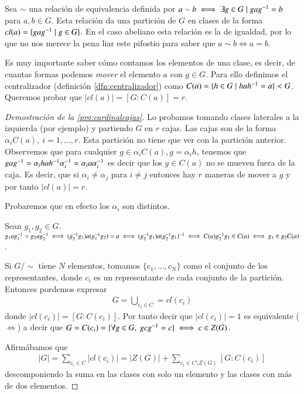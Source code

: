 Sea $\sim$ una relación de equivalencia definida por $a\sim b \iff \exists g \in G \mid gag^{-1} = b$ para $a,b \in G$. Esta relación da una partición de $G$ en clases de la forma $cl(a) = \{gag^{-1} \mid g \in G\}$. En el caso abeliano esta relación es la de igualdad, por lo que no nos merece la pena liar este pifostio para saber que $a\sim b \iff a = b$. 

Es muy importante saber cómo contamos los elementos de una clase, es decir, de cuantas formas podemos \textit{mover} el elemento $a$ con $g \in G$. Para ello definimos el centralizador (definición \ref{dfn:centralizador}) como $C(a) = \{h \in G \mid hah^{-1} = a\} < G$. Queremos probar que $|cl(a)| = [G:C(a)] = r$.

\begin{proof}[Demostración de la \autoref{pro:cardinalcajas}]
	
	Lo probamos tomando clases laterales a la izquierda (por ejemplo) y partiendo $G$ en $r$ cajas. Las cajas son de la forma $\alpha_iC(a),\ i = 1, \dots, r$. Esta partición no tiene que ver con la partición anterior. Observemos que para cualquier $g \in \alpha_i C(a), g = \alpha_i h$, tenemos que $g a g^{-1} = \alpha_i h a h^{-1} \alpha_i^{-1} = \alpha_i a \alpha_i^{-1}$ es decir que los $g \in C(a)$ no se mueven fuera de la caja. Es decir, que si $\alpha_i \neq \alpha_j$ para $i\neq j$ entonces hay $r$ maneras de mover a $g$ y por tanto $|cl(a)| = r$.
	
	Probaremos que en efecto los $\alpha_i$ son distintos.
	
	Sean $g_1, g_2 \in G$. $g_1ag_1^{-1} = g_2ag_2^{-1} \iff (g_2^{-1}g_1)a(g_1^{-1}g_2) = a \iff (g_2^{-1}g_1)a(g_2^{-1}g_1)^{-1} \iff C(a) g_2^{-1}g_1 \in C(a) \iff g_1 \in g_2C(a)$.
	
	Si $G/\sim$ tiene $N$ elementos, tomamos $\{c_1, \dots, c_N\}$ como el conjunto de los representantes, donde $c_i$ es un representante de cada conjunto de la partición. Entonces pordemos expresar
	\begin{align*}
	G = \bigcup_{c_i \in C} = cl(c_i)
	\end{align*}
	donde $|cl(c_i)| = [G:C(c_i)]$. Por tanto decir que $|cl(c_i)| = 1$ es equivalente ($\iff$) a decir que $G = C(c_i) = \{\forall g \in G,\ gc\inv{g} = c\} \iff c \in Z(G)$.
	
	Afirmábamos que
	\begin{align*}
	|G| = \sum_{c_i \in C} |cl(c_i)| = |Z(G)| + \sum_{c_i \in C\setminus Z(G)} [G:C(c_i)]
	\end{align*}
	descomponiendo la suma en las clases con solo un elemento y las clases con más de dos elementos.
\end{proof}



